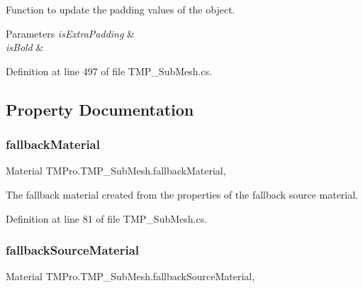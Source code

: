Function to update the padding values of the object. 


\begin{DoxyParams}{Parameters}
{\em is\+Extra\+Padding} & \\
\hline
{\em is\+Bold} & \\
\hline
\end{DoxyParams}


Definition at line 497 of file T\+M\+P\+\_\+\+Sub\+Mesh.\+cs.



\subsection{Property Documentation}
\mbox{\label{class_t_m_pro_1_1_t_m_p___sub_mesh_ab77df446a9272aeb7b29e189ed42d408}} 
\subsubsection{\texorpdfstring{fallbackMaterial}{fallbackMaterial}}
{\footnotesize\ttfamily Material T\+M\+Pro.\+T\+M\+P\+\_\+\+Sub\+Mesh.\+fallback\+Material\hspace{0.3cm}{\ttfamily [get]}, {\ttfamily [set]}}



The fallback material created from the properties of the fallback source material. 



Definition at line 81 of file T\+M\+P\+\_\+\+Sub\+Mesh.\+cs.

\mbox{\label{class_t_m_pro_1_1_t_m_p___sub_mesh_a323c171d10bb001f23b750d9404b68a8}} 
\subsubsection{\texorpdfstring{fallbackSourceMaterial}{fallbackSourceMaterial}}
{\footnotesize\ttfamily Material T\+M\+Pro.\+T\+M\+P\+\_\+\+Sub\+Mesh.\+fallback\+Source\+Material\hspace{0.3cm}{\ttfamily [get]}, {\ttfamily [set]}}



